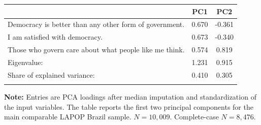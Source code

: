 \begin{tabular*}{\textwidth}{@{\extracolsep{\fill}}lcc}
\doubletoprule
 & PC1 & PC2 \\
\midrule
Democracy is better than any other form of government. & 0.670 & -0.361 \\
I am satisfied with democracy. & 0.673 & -0.340 \\
Those who govern care about what people like me think. & 0.574 & 0.819 \\
\midrule
Eigenvalue: & 1.231 & 0.915 \\
Share of explained variance: & 0.410 & 0.305 \\
\doublebottomrule
\end{tabular*}

\begin{minipage}{\textwidth}
\footnotesize
\textbf{Note:} Entries are PCA loadings after median imputation and standardization of the input variables. The table reports the first two principal components for the main comparable LAPOP Brazil sample. $N = 10,009$. Complete-case $N = 8,476.$
\end{minipage}
